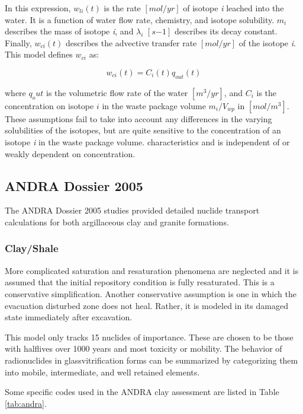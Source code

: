 In this expression, $w_{li}(t)$ is the rate $[mol/yr]$ of isotope \emph{i}
leached into the water.  It is a function of water flow rate, chemistry, and
isotope solubility. $m_i$ describes the mass of isotope \emph{i}, and
$\lambda_i$ $[s{-1}]$ describes its decay constant. Finally, $w_{ci}(t)$
describes the advective transfer rate $[mol/yr]$ of the isotope \emph{i}. This 
model defines $w_{ci}$ as:

\begin{equation}
  w_{ci}(t)=C_i(t)q_{out}(t) 
\end{equation}

where $q_out$ is the volumetric flow rate of the water $[m^3/yr]$, and 
$C_i$ is the concentration on isotope $i$ in the waste package volume 
$m_i/V_{wp}$ in $[mol/m^3]$. These assumptions fail to take into account any
differences in the varying solubilities of the isotopes, but are quite
sensitive to the concentration of an isotope \emph{i} in the waste package
volume.  
characteristics and is independent of or weakly dependent on concentration.  

\subsection{ANDRA Dossier 2005} The ANDRA Dossier 2005 studies provided
detailed nuclide transport calculations for both argillaceous clay and granite
formations. 

\subsubsection{Clay/Shale} More complicated saturation and resaturation phenomena 
are neglected and it is assumed that the initial repository condition is fully
resaturated. This is a conservative simplification. Another conservative
assumption is one in which the evacuation disturbed zone does not heal. Rather,
it is modeled in its damaged state immediately after excavation. 

This model only tracks 15 nuclides of importance.  These are chosen to be those
with halflives over 1000 years and most toxicity or mobility.
\cite{andra_argile:_2005} The behavior of radionuclides in 
glassvitrification forms can be summarized by categorizing them into mobile,
intermediate, and well retained elements. 

Some specific codes used in the \gls{ANDRA} clay assessment are listed in Table  
\ref{tab:andra}.


